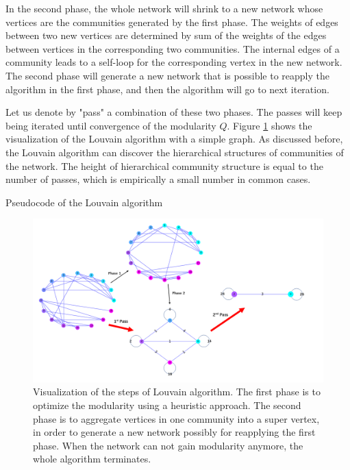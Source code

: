 \documentclass[11pt]{article}
\begin{document}
\noindent In the second phase, the whole network will shrink to a new network whose vertices are the communities generated by the first phase. The weights of edges between two new vertices are determined by sum of the weights of the edges between vertices in the corresponding two communities. The internal edges of a community leads to a self-loop for the corresponding vertex in the new network. The second phase will generate a new network that is possible to reapply the algorithm in the first phase, and then the algorithm will go to next iteration.

\noindent Let us denote by "pass" a combination of these two phases. The passes will keep being iterated until convergence of the modularity $Q$. Figure \ref{fig:louvain} shows the visualization of the Louvain algorithm with a simple graph. As discussed before, the Louvain algorithm can discover the hierarchical structures of communities of the network. The height of hierarchical community structure is equal to the number of passes, which is empirically a small number in common cases.

\begin{algorithm}
	\caption{Pseudocode of the Louvain algorithm\cite{aynaud2010static}}
	\label{louvain_code}
	\begin{algorithmic}
		\REPEAT
		\ENDFOR
		\ENDWHILE
		\ELSE 
		\ENDIF
	\end{algorithmic}
\end{algorithm} 

\begin{figure}[p]
  \centering
  \includegraphics[scale=0.5]{figures/louvain.png}
  \caption{Visualization of the steps of Louvain algorithm. The first phase is to optimize the modularity using a heuristic approach. The second phase is to aggregate vertices in one community into a super vertex, in order to generate a new network possibly for reapplying the first phase. When the network can not gain modularity anymore, the whole algorithm terminates.}
  \label{fig:louvain}
\end{figure} 
\end{document}

